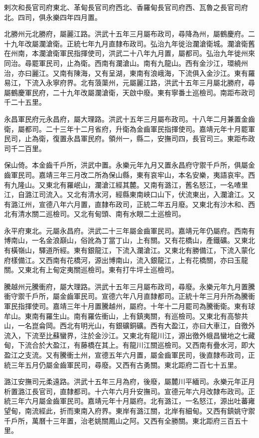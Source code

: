 剌次和長官司府東北、革甸長官司府西北、香羅甸長官司府西、瓦魯之長官司府北。四司，俱永樂四年四月置。

北勝州元北勝府，屬麗江路。洪武十五年三月屬布政司，尋降為州，屬鶴慶府。二十九年改屬瀾滄衛。正統七年九月直隸布政司。弘治九年徙治瀾滄衛城。瀾滄衛舊在州南，本瀾滄衛軍民指揮使司，洪武二十八年九月置，屬都司。弘治九年徙州來同治。尋罷軍民司，止為衛。西南有瀾滄山。南有九龍山。西有金沙江，環繞州治，亦曰麗江。又南有陳海，又有呈湖，東南有浪峨海，下流俱入金沙江。東有羅易江，下流入永寧府界。北有蒗蕖州，元屬麗江路，洪武十五年三月屬北勝府，尋屬鶴慶軍民府，二十九年改屬瀾滄衛，天啟中廢。東有寧番土巡檢司。南距布政司千二十五里。

永昌軍民府元永昌府，屬大理路。洪武十五年三月屬布政司。十八年二月兼置金齒衛，屬都司。二十三年十二月省府，升衛為金齒軍民指揮使司。嘉靖元年十月罷軍民司，止為衛，復置永昌軍民府。領州一，縣二，安撫司四，長官司三。東距布政司千二百里。

保山倚。本金齒千戶所，洪武中置。永樂元年九月又置永昌府守禦千戶所，俱屬金齒軍民司。嘉靖三年三月改二所為保山縣，東有哀牢山，本名安樂，夷語哀牢。西有九隆山。又東北有羅岷山，瀾滄江經其麓。又南有潞江，舊名怒江，一名喳里江，自潞江司流入。又北有清水河，經縣東南峽口山下，伏流東出，入瀾滄江。又有潞江州，宣德八年六月置，直隸布政司，正統二年五月廢。又東北有沙木和、西北有清水關二巡檢司。又北有甸頭、南有水眼二土巡檢司。

永平府東北。元屬永昌府。洪武二十三年屬金齒軍民司。嘉靖元年仍屬府。西南有博南山，一名金浪巔山，俗訛為丁當丁山，上有關。又有花橋山，產鐵礦。又東北有橫嶺山，驛道所經。東有銀龍江，下流入瀾滄江。又東北有勝備江，下流入蒙化府樣備江。又西南有花橋河，源出博南山，流入銀龍江，上有花橋關，亦曰玉龍關。又東北有上甸定夷關巡檢司。東有打牛坪土巡檢司。

騰越州元騰衝府，屬大理路。洪武十五年三月屬布政司，尋廢。永樂元年九月置騰衝守禦千戶所，屬金齒軍民司。宣德六年八月直隸都司。正統十年三月升所為騰衝軍民指揮使司。嘉靖三年十月置騰越州，屬府。十年十二月罷司為騰衝衛。東有球牟山。東南有羅生山。南有羅佐衝山，上有鎮夷關，有巡檢司。又東北有高黎共山，一名崑侖岡。西北有明光山，有銀礦銅礦。西有大盈江，亦曰大車江，自徼外流入，下流至比蘇蠻界，注於金沙江。又東北有龍川江，源出徼外蛾昌蠻地之七藏甸，下流合於大盈江，有藤橋在其上。有龍川江關巡檢司。又西南有疊水河，即大盈江之支流。又有騰衝土州，宣德五年六月置，屬金齒軍民司，後直隸布政司，正統三年五月仍屬金齒軍民司，尋廢。又西有古勇關。東北距府二百七十五里。

潞江安撫司元柔遠路。洪武十五年三月為府，後廢，屬麓川平緬司。永樂元年正月析置潞江長官司，直隸都司。十六年六月升安撫司。宣德元年六月改隸布政司。正統三年六月屬金齒軍民司。嘉靖元年十月屬府。北有潞江，一名怒江，源出吐蕃雍望甸，南流經此，折而東南入府界。東岸有潞江關，北岸有細甸。又西有鎮姚守禦千戶所，萬曆十三年置，治老姚關鳳山之阿。又西有全勝關。東北距府三百五十里。


